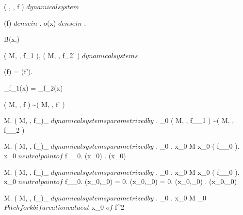 \documentclass[../Main/main]{subfiles}
\begin{document}
{	
	{
		{
			( \R, \N, f ) $ dynamical system $
		}
		{
			\fixed(f) $ dense in $ \R.
			{
				o(x) $ dense in $ \R
			}.

			{
				\ex{ \epsilon \in \R^+ }
				{
					\all{ \delta \in \R^+ }
					{
						{
							 \nin B(x,\epsilon)
						}
					}
				}
			}
		}
	}	
	
	
	{
		{
			( M, \N, f_1 ), ( M, \N, f_2' ) $ dynamical systems $
		}
		{
			\fixed(f) = \fixed(f').

			\all{ x \in \fixed(f) }
			{
				\chi_{f_1}(x) = \chi_{f_2}(x)
			}
		}
		\denote
		{
			( M, \N, f ) \sim ( M, \N, f' )
		}
	}
	
	
	{
		{
			\Lambda \subset M.
			( M, \N, f_\lambda )_{\lambda \in \Lambda} $ dynamical systems parametrized by $ \Lambda.
			\lambda_0 \in \Lambda
		}
		{
			\all{ \epsilon \in \R^+ }
			{
				{
					( M, \N, f_{\lambda_1} ) \not\sim ( M, \N, f_{\lambda_2} )
				}
			}
		}
	}
	
	
	{
		{
			\Lambda \subset M.
			( M, \N, f_\lambda )_{\lambda \in \Lambda} $ dynamical systems parametrized by $ \Lambda.
			\lambda_0 \in \Lambda.
			x_0 \in M
		}
		{
			x_0 \in \fixed( f_{\lambda_0} ).
			x_0 $ neutral point of $ f_{\lambda_0}.
			(x_0) .
			(x_0) 
		}
	}
	
	
	{
		{
			\Lambda \subset M.
			( M, \N, f_\lambda )_{\lambda \in \Lambda} $ dynamical systems parametrized by $ \Lambda.
			\lambda_0 \in \Lambda.
			x_0 \in M
		}
		{
			x_0 \in \fixed( f_{\lambda_0} ).
			x_0 $ neutral point of $ f_{\lambda_0}.
			(x_0,\lambda_0) = 0.
			(x_0,\lambda_0) = 0.
			(x_0,\lambda_0) .
			(x_0,\lambda_0) 
		}
	}
	
	
	{
		{
			\Lambda \subset M.
			( M, \N, f_\lambda )_{\lambda \in \Lambda} $ dynamical systems parametrized by $ \Lambda.
			\lambda_0 \in \Lambda.
			x_0 \in M
		}
		{
			\lambda_0 $ Pitchfork bifurcation value at $ x_0 $ of $ f^2
		}
	}	

}
\end{document}
